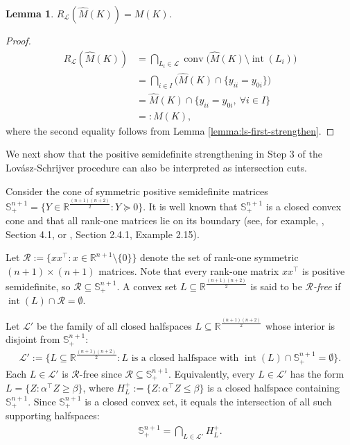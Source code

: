 \documentclass{article}
\newtheorem{lemma}{Lemma}
\newcommand{\R}{\mathbb{R}}
\renewcommand{\L}{\mathcal{L}}
\begin{document}
\begin{lemma} \label{lemma:ls-family} 
    $R_\L(\hat M(K)) = M(K)$.
\end{lemma}
\begin{proof}
    \begin{align}
        R_\L(\hat M(K)) &= \bigcap_{L_i \in \L} \operatorname{conv}\big(\hat M(K) \setminus \operatorname{int}(L_i)\big) \\
        &= \bigcap_{i \in I} \big(\hat M(K) \cap \{y_{ii} = y_{0i}\}\big)  \\
        &= \hat M(K) \cap \{y_{ii} = y_{0i}, \ \forall i \in I\} \\
        &=: M(K),
    \end{align}
    where the second equality follows from Lemma \ref{lemma:ls-first-strengthen}.
\end{proof}

We next show that the positive semidefinite strengthening in Step 3 of the Lov\'asz-Schrijver procedure can also be interpreted as intersection cuts.

Consider the cone of symmetric positive semidefinite matrices $\mathbb{S}^{n+1}_+ = \{Y \in \R^{\frac{(n+1)(n+2)}{2}} : Y \succeq 0\}$. It is well known that $\mathbb{S}^{n+1}_+$ is a closed convex cone and that all rank-one matrices lie on its boundary (see, for example, \cite{ben2001lectures}, Section 4.1, or \cite{boyd2004convex}, Section 2.4.1, Example 2.15).

Let $\mathcal{R} := \{xx^\top : x \in \R^{n+1}\setminus\{0\}\}$ denote the set of rank-one symmetric $(n+1) \times (n+1)$ matrices. Note that every rank-one matrix $xx^\top$ is positive semidefinite, so $\mathcal{R} \subseteq \mathbb{S}^{n+1}_+$.
A convex set $L \subseteq \R^{\frac{(n+1)(n+2)}{2}}$ is said to be \emph{$\mathcal{R}$-free} if $\operatorname{int}(L) \cap \mathcal{R} = \emptyset$.

Let $\L'$ be the family of all closed halfspaces $L \subseteq \R^{\frac{(n+1)(n+2)}{2}}$ whose interior is disjoint from $\mathbb{S}^{n+1}_+$:
\begin{align}
    \L' := \{L \subseteq \R^{\frac{(n+1)(n+2)}{2}} : L \text{ is a closed halfspace with } \operatorname{int}(L) \cap \mathbb{S}^{n+1}_+ = \emptyset\}.
\end{align}
Each $L \in \L'$ is $\mathcal{R}$-free since $\mathcal{R} \subseteq \mathbb{S}^{n+1}_+$. Equivalently, every $L \in \L'$ has the form $L = \{Z : \alpha^\top Z \geq \beta\}$, where $H^+_L := \{Z : \alpha^\top Z \leq \beta\}$ is a closed halfspace containing $\mathbb{S}^{n+1}_+$. Since $\mathbb{S}^{n+1}_+$ is a closed convex set, it equals the intersection of all such supporting halfspaces:
\begin{align}
    \mathbb{S}^{n+1}_+ = \bigcap_{L \in \L'} H^+_L. \label{eq:psd-halfspace-intersection}
\end{align}
\end{document}
